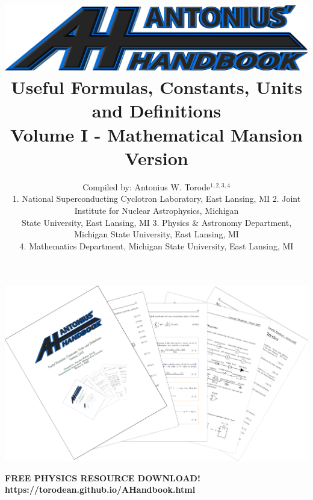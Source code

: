 \documentclass[openany,twoside, notitlepage,letterpaper,11pt]{book}
\title{\includegraphics[scale=.22]{./Images/Covers/AH2.png}
	\\ \vspace{1.5cm} Useful Formulas, Constants, Units and Definitions \\ Volume I - Mathematical Mansion \\ Version \Version}
\date{}
\author{Compiled by: Antonius W. Torode$^{1,2,3,4}$ \\ \scriptsize{1. National Superconducting Cyclotron Laboratory, East Lansing, MI 2. Joint Institute for Nuclear Astrophysics, Michigan} \\ \scriptsize{State University, East Lansing, MI 3. Physics \& Astronomy Department, Michigan State University, East Lansing, MI} \\ \scriptsize{4. Mathematics Department, Michigan State University, East Lansing, MI}}
\begin{document}
\frontmatter
\maketitle
\thispagestyle{empty}
\pagestyle{empty}
\begin{center}
	\includegraphics[scale=1.8]{./Images/Covers/background_tunnel.png}
	
{\Large \textbf{FREE PHYSICS RESOURCE DOWNLOAD!}\\ \textbf{https://torodean.github.io/AHandbook.html} }
\end{center}
\end{document}
